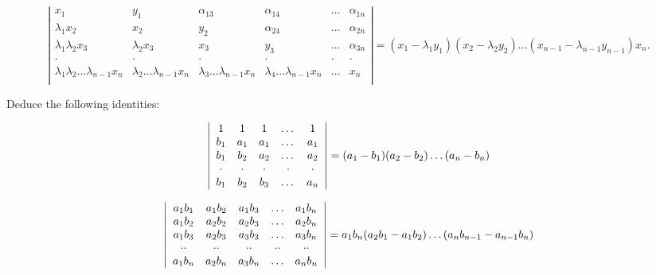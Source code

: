 \[
\left| \begin{array}{cccccc} x _ {1} & y _ {1} & \alpha_ {1 3} & \alpha_ {1 4} & \ldots & \alpha_ {1 n} \\ \lambda_ {1} x _ {2} & x _ {2} & y _ {2} & \alpha_ {2 4} & \ldots & \alpha_ {2 n} \\ \lambda_ {1} \lambda_ {2} x _ {3} & \lambda_ {2} x _ {3} & x _ {3} & y _ {3} & \ldots & \alpha_ {3 n} \\ \cdot & \cdot & \cdot & \cdot & \cdot & \cdot \\ \lambda_ {1} \lambda_ {2} \ldots \lambda_ {n - 1} x _ {n} & \lambda_ {2} \ldots \lambda_ {n - 1} x _ {n} & \lambda_ {3} \ldots \lambda_ {n - 1} x _ {n} & \lambda_ {4} \ldots \lambda_ {n - 1} x _ {n} & \ldots & x _ {n} \\ \end{array} \right| = (x _ {1} - \lambda_ {1} y _ {1}) (x _ {2} - \lambda_ {2} y _ {2}) \ldots (x _ {n - 1} - \lambda_ {n - 1} y _ {n - 1}) x _ {n}.
\]

Deduce the following identities:

\[
\left| \begin{array}{c c c c c} 1 & 1 & 1 & \dots & 1 \\ b _ {1} & a _ {1} & a _ {1} & \dots & a _ {1} \\ b _ {1} & b _ {2} & a _ {2} & \dots & a _ {2} \\ \cdot & \cdot & \cdot & \cdot & \cdot \\ b _ {1} & b _ {2} & b _ {3} & \dots & a _ {n} \end{array} \right| = (a _ {1} - b _ {1}) (a _ {2} - b _ {2}) \dots (a _ {n} - b _ {n})
\]

\[
\left| \begin{array}{c c c c c} a _ {1} b _ {1} & a _ {1} b _ {2} & a _ {1} b _ {3} & \ldots & a _ {1} b _ {n} \\ a _ {1} b _ {2} & a _ {2} b _ {2} & a _ {2} b _ {3} & \ldots & a _ {2} b _ {n} \\ a _ {1} b _ {3} & a _ {2} b _ {3} & a _ {3} b _ {3} & \ldots & a _ {3} b _ {n} \\ \cdot \cdot & \cdot \cdot & \cdot \cdot & \cdot \cdot & \cdot \cdot \\ a _ {1} b _ {n} & a _ {2} b _ {n} & a _ {3} b _ {n} & \ldots & a _ {n} b _ {n} \end{array} \right| = a _ {1} b _ {n} (a _ {2} b _ {1} - a _ {1} b _ {2}) \ldots (a _ {n} b _ {n - 1} - a _ {n - 1} b _ {n})
\]

